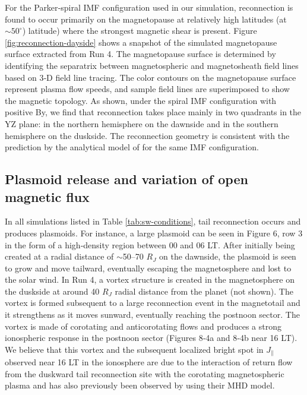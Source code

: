 For the Parker‐spiral IMF configuration used in our simulation, reconnection is found to occur primarily on the magnetopause at relatively high latitudes (at $\sim50^\circ$) latitude) where the strongest magnetic shear is present. Figure \ref{fig:reconnection-dayside} shows a snapshot of the simulated magnetopause surface extracted from Run 4. The magnetopause surface is determined by identifying the separatrix between magnetospheric and magnetosheath field lines based on 3‐D field line tracing. The color contours on the magnetopause surface represent plasma flow speeds, and sample field lines are superimposed to show the magnetic topology. As shown, under the spiral IMF configuration with positive By, we find that reconnection takes place mainly in two quadrants in the YZ plane: in the northern hemisphere on the dawnside and in the southern hemisphere on the duskside. The reconnection geometry is consistent with the prediction by the analytical model of \cite{Masters2017} for the same IMF configuration.

\subsection{Plasmoid release and variation of open magnetic flux}

In all simulations listed in Table \ref{tab:sw-conditions}, tail reconnection occurs and produces plasmoids. For instance, a large plasmoid can be seen in Figure 6, row 3 in the form of a high‐density region between 00 and 06 LT. After initially being created at a radial distance of $\sim$50–70 $R_J$ on the dawnside, the plasmoid is seen to grow and move tailward, eventually escaping the magnetosphere and lost to the solar wind. In Run 4, a vortex structure is created in the magnetosphere on the duskside at around 40 $R_J$ radial distance from the planet (not shown). The vortex is formed subsequent to a large reconnection event in the magnetotail and it strengthens as it moves sunward, eventually reaching the postnoon sector. The vortex is made of corotating and anticorotating flows and produces a strong ionospheric response in the postnoon sector (Figures 8‐4a and 8‐4b near 16 LT). We believe that this vortex and the subsequent localized bright spot in $J_\parallel$ observed near 16 LT in the ionosphere are due to the interaction of return flow from the duskward tail reconnection site with the corotating magnetospheric plasma and has also previously been observed by \cite{Fukazawa2006a} using their MHD model. 

